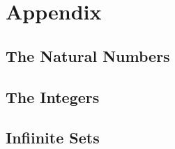 \setcounter{chapter}{0}
\renewcommand{\thechapter}{A}
\chapter{Appendix}\label{ch:A}
\setcounter{equation}{0}	        %

\section{The Natural Numbers}\label{sec:A.1}
\section{The Integers}\label{sec:A.2}
\section{Infiinite Sets}\label{sec:A.3}

